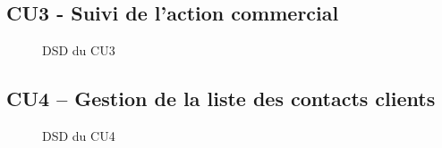 \subsection{CU3 - Suivi de l’action commercial}
\begin{figure}[H]
\noindent{}
\caption{DSD du CU3}
\end{figure}

\subsection{CU4 – Gestion de la liste des contacts clients}
\begin{figure}[H]
\noindent{}
\caption{DSD du CU4}
\end{figure}


